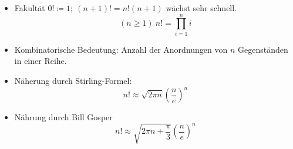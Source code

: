 \begin{itemize}
    \item Fakultät $0! \coloneqq 1;\ (n+1)!=n!(n+1)$ wächst sehr schnell.
    \[(n \geq 1)\ n! = \prod\limits_{i=1}^n i\]
    \item Kombinatorische Bedeutung: Anzahl der Anordnungen von $n$ Gegenständen in einer Reihe.
    \item Näherung durch Stirling-Formel:
    \[n! \approx \sqrt{2 \pi n} \left(\frac{n}{e}\right)^n\]
    \item Nährung durch Bill Gosper
    \[n! \approx \sqrt{2 \pi n + \frac{\pi}{3}}\left(\frac{n}{e}\right)^n\]
\end{itemize}
